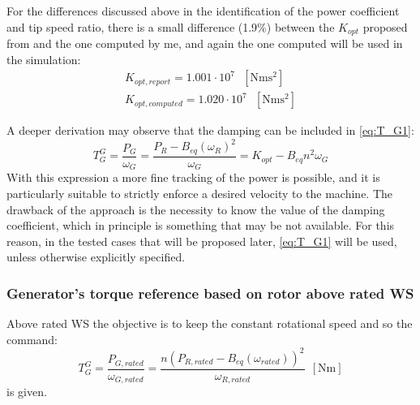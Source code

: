  For the differences discussed above in the identification of the power coefficient and tip speed ratio, there is a small difference (1.9$\%$) between the $K_{opt}$ proposed from \cite{DTU_Wind_Energy_Report-I-0092} and the one computed by me, and again the one computed will be used in the simulation:
 \begin{gather*}
     K_{opt, report} = 1.001 \cdot 10^7 \ \ \ \left[\si{\newton\meter\square\second}\right] \\
     K_{opt, computed} = 1.020 \cdot 10^7 \ \ \ \left[\si{\newton\meter\square\second}\right] 
 \end{gather*}

 A deeper derivation may observe that the damping can be included in \autoref{eq:T_G1}:
 \begin{equation}
  T_G^{G} = \frac{P_G}{\omega_G} = \frac{P_R-B_{eq}(\omega_R)^2}{\omega_G} = K_{opt} - B_{eq}n^2\omega_G  
  \label{eq:T_G5}
 \end{equation}
 With this expression a more fine tracking of the power is possible, and it is particularly suitable to strictly enforce a desired velocity to the machine. The drawback of the approach is the necessity to know the value of the damping coefficient, which in principle is something that may be not available. For this reason, in the tested cases that will be proposed later, \autoref{eq:T_G1} will be used, unless otherwise explicitly specified.

\subsubsection[Above WS]{Generator's torque reference based on rotor above rated WS}
Above rated WS the objective is to keep the constant rotational speed and so the command:
\begin{equation}
    T_G^{G} = \frac{P_{G,rated}}{\omega_{G,rated}} = \frac{n\left(P_{R,rated}-B_{eq}\left(\omega_{rated}\right)\right)^2}{\omega_{R,rated}}\ \ \left[\si{\newton\meter}\right]
    \label{eq:T_G3}
\end{equation}
is given.


